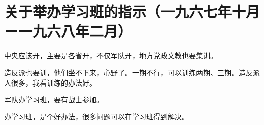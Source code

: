 \section[关于举办学习班的指示（一九六七年十月－一九六八年二月）]{关于举办学习班的指示（一九六七年十月－一九六八年二月）}


中央应该开，主要是各省开，不仅军队开，地方党政文教也要集训。

造反派也要训，他们坐不下来，心野了。一期不行，可以训练两期、三期。造反派人很多，我看训练的办法好。

军队办学习班，要有战士参加。

办学习班，是个好办法，很多问题可以在学习班得到解决。


